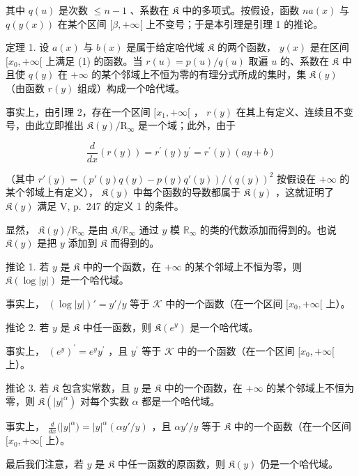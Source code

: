 其中 \(q(u)\) 是次数 \(\leqslant n - 1\) 、系数在 \(\mathfrak{K}\) 中的多项式。按假设，函数 \(na(x)\) 与 \(q(y(x))\) 在某个区间 \([\beta, +\infty[\) 上不变号；于是本引理是引理 1 的推论。

定理 1. 设 \(a(x)\) 与 \(b(x)\) 是属于给定哈代域 \(\mathfrak{K}\) 的两个函数， \(y(x)\) 是在区间 \([x_0, +\infty[\) 上满足 (1) 的函数。当 \(r(u) = p(u) / q(u)\) 取遍 \(u\) 的、系数在 \(\mathfrak{K}\) 中且使 \(q(y)\) 在 \(+\infty\) 的某个邻域上不恒为零的有理分式所成的集时，集 \(\mathfrak{K}(y)\) （由函数 \(r(y)\) 组成）构成一个哈代域。

事实上，由引理 2，存在一个区间 \([x_1, +\infty[\) ， \(r(y)\) 在其上有定义、连续且不变号，由此立即推出 \(\mathfrak{K}(y)/\mathrm{R}_{\infty}\) 是一个域；此外，由于

\[
\frac {d}{d x} (r (y)) = r ^ {\prime} (y) y ^ {\prime} = r ^ {\prime} (y) (a y + b)
\]

（其中 \(r'(y) = \left(p'(y)q(y) - p(y)q'(y)\right)/\left(q(y)\right)^2\) 按假设在 \(+\infty\) 的某个邻域上有定义）， \(\mathfrak{K}(y)\) 中每个函数的导数都属于 \(\mathfrak{K}(y)\) ，这就证明了 \(\mathfrak{K}(y)\) 满足 V, p.~247 的定义 1 的条件。

显然， \(\mathfrak{K}(y) / \mathbb{R}_{\infty}\) 是由 \(\mathfrak{K} / \mathbb{R}_{\infty}\) 通过 \(y\) 模 \(\mathbb{R}_{\infty}\) 的类的代数添加而得到的。也说 \(\mathfrak{K}(y)\) 是把 \(y\) 添加到 \(\mathfrak{K}\) 而得到的。

推论 1. 若 \(y\) 是 \(\mathfrak{K}\) 中的一个函数，在 \(+\infty\) 的某个邻域上不恒为零，则 \(\mathfrak{K}(\log |y|)\) 是一个哈代域。

事实上， \((\log |y|)' = y'/y\) 等于 \(\mathcal{K}\) 中的一个函数（在一个区间 \([x_0, +\infty[\) 上）。

推论 2. 若 \(y\) 是 \(\mathfrak{K}\) 中任一函数，则 \(\mathfrak{K}(e^y)\) 是一个哈代域。

事实上， \(\left(e^{y}\right)^{\prime} = e^{y}y^{\prime}\) ，且 \(y^\prime\) 等于 \(\mathcal{K}\) 中的一个函数（在一个区间 \([x_0, +\infty[\) 上）。

推论 3. 若 \(\mathfrak{K}\) 包含实常数，且 \(y\) 是 \(\mathfrak{K}\) 中的一个函数，在 \(+\infty\) 的某个邻域上不恒为零，则 \(\mathfrak{K}(|y|^{\alpha})\) 对每个实数 \(\alpha\) 都是一个哈代域。

事实上， \(\frac{d}{dx}\big(|y|^{\alpha}\big) = |y|^{\alpha}(\alpha y'/y)\) ，且 \(\alpha y'/y\) 等于 \(\mathfrak{K}\) 中的一个函数（在一个区间 \([x_0, +\infty[\) 上）。

最后我们注意，若 \(y\) 是 \(\mathfrak{K}\) 中任一函数的原函数，则 \(\mathfrak{K}(y)\) 仍是一个哈代域。

